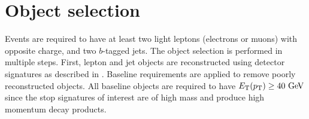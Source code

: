 \begin{table}[ht]
  \caption{
    Stop cross sections and their associated
    uncertainties~\cite{Beenakker:1997ut,Beenakker:2010nq,Beenakker:2011fu}.
  }
  \label{tab:stop_xsec}
\end{table}

\FloatBarrier
\section{Object selection}
\label{sec:object_selection}

Events are required to have at least two light leptons (electrons or muons)
with opposite charge, and two $b$-tagged jets.
The object selection is performed in multiple steps.
First, lepton and jet objects are reconstructed using detector signatures
as described in .
Baseline requirements are applied to remove poorly reconstructed objects.
All baseline objects are required to have $\ET(\pt) \geq 40 \GeV$ since the
stop signatures of interest are of high mass and produce high momentum decay
products.

